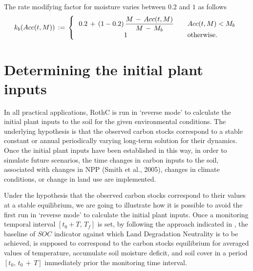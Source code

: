 \begin{itemize}
\noindent  The rate modifying factor for moisture  varies between
$0.2$ and $1$ as follows
 $$
    k_b(Acc(t,M))\,: =\,  \left\{
     \begin{array}{cl}
      \, 0.2\, +\, (1-0.2) \, \displaystyle \frac{M\, -\, Acc(t,M)}{M\,-\,M_b } & \quad Acc(t,M)<M_b \\
     1 &\quad \textup{otherwise}.
     \end{array}
     \right.
     $$
     
    \end{itemize}  
     
  \section{Determining the initial plant inputs}\label{sec:3}
In all practical applications,   RothC is run in
\textquoteleft reverse mode' to calculate the initial plant inputs to the soil for the given environmental conditions. The underlying hypothesis is that the observed carbon stocks correspond to a stable constant or annual periodically varying long-term solution for their dynamics.  Once the initial plant inputs
 have been established in this way, in order to simulate future scenarios, the time changes in carbon inputs to the soil, associated  with changes in NPP (Smith et al., 2005), changes in climate conditions, or change in land use are implemented. 

\noindent Under the hypothesis that the observed carbon stocks correspond to their values at a stable equilibrium, we are going to illustrate how it is possible to avoid the first run in
\textquoteleft reverse mode' to calculate the initial plant inputs.
 Once a monitoring temporal interval $[t_0+T,\, T_f]$ is set,  by following the approach indicated in \cite{minelli2017scientific}, the baseline of $SOC$ indicator against which Land Degradation Neutrality is to be achieved, is supposed to  correspond to the carbon stocks equilibrium for averaged values of temperature, accumulate soil moisture deficit, and soil cover in a period $[t_0, \, t_0\,+\,T]$ immediately prior the monitoring time interval.    

